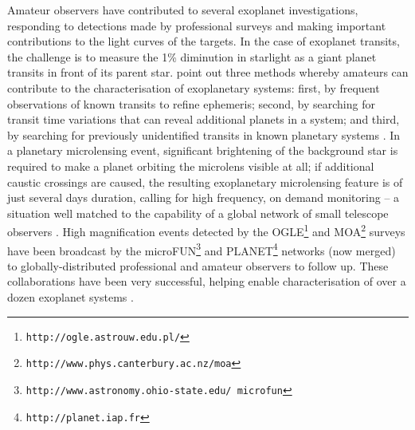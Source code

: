 \documentclass{ar2e}
\def\CaseStudy#1{\noindent{\it\bf #1 \,\,\,\,}}
\def\url#1{\texttt{#1}}
\begin{document}
\CaseStudy{Transiting and Microlensing Exoplanets.}  
Amateur observers have contributed to several exoplanet investigations,
responding to detections made by professional surveys and making important
contributions to the light curves of the targets. In the case of exoplanet
transits, the challenge is to measure the 1\% diminution in starlight as a giant
planet transits in front of its parent star. \citet{14mousis_proam} point out three
methods whereby amateurs can contribute to the characterisation of exoplanetary
systems: first, by frequent observations of known transits to refine ephemeris;
second, by searching for transit time variations that can reveal additional
planets in a system; and third, by searching for previously unidentified
transits in known planetary systems \citep[e.g., the discovery of the transit of
HD 80606b from a 30 cm telescope near London,][]{09fossey}. In a planetary
microlensing event, significant brightening of the background star is required
to make a planet orbiting the microlens visible at all; if additional caustic
crossings are caused, the resulting exoplanetary microlensing feature is of just
several days duration, calling for high frequency, on demand monitoring -- a
situation well matched to the capability of a global network of small telescope
observers \citep[see e.g.\ ][]{Christie2006}. High magnification events
detected by the  OGLE\footnote{\url{http://ogle.astrouw.edu.pl/}} and
MOA\footnote{\url{http://www.phys.canterbury.ac.nz/moa}} surveys have been
broadcast by the
microFUN\footnote{\url{http://www.astronomy.ohio-state.edu/~microfun}} and
PLANET\footnote{\url{http://planet.iap.fr}} networks (now merged) to
globally-distributed professional and amateur observers to follow up. These
collaborations have been very successful, helping enable characterisation of
over a dozen exoplanet systems \citep[see e.g.\ ][and references
therein]{Udalski++2005,Gould++2014}.


% 
% 
\end{document}
